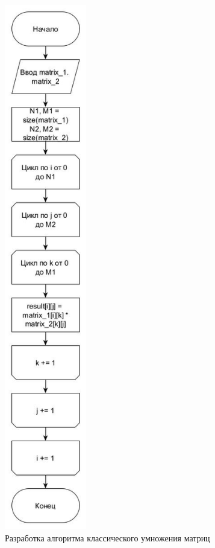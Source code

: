 \FloatBarrier
\begin{figure}[hp]
	\begin{center}
		\includegraphics[height=23cm]{graph/classic.jpg}
	\end{center}
	\caption{Разработка алгоритма классического умножения матриц}
\end{figure}
\FloatBarrier

